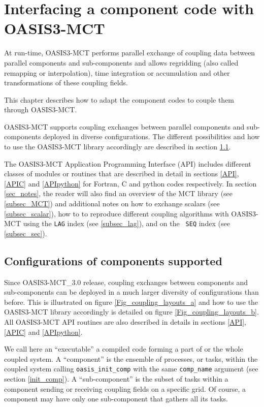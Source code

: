 \newpage
\chapter{Interfacing a component code with OASIS3-MCT}
\label{sec_modelinterfacing}

At run-time, OASIS3-MCT performs parallel exchange of coupling data between parallel
components and sub-components and allows regridding (also called remapping or interpolation), time integration or accumulation and other transformations of these coupling fields.

This chapter describes how to adapt the component codes to couple them through OASIS3-MCT.

OASIS3-MCT supports coupling exchanges between parallel
components and sub-components deployed in diverse
configurations. The different possibilities and how to use
the OASIS3-MCT library accordingly are described in section
\ref{sec_deploy}.

The OASIS3-MCT Application Programming Interface (API) includes different classes of modules or routines that are described in detail in sections \ref{API}, \ref{APIC} and \ref{APIpython} for Fortran, C and python codes respectively.
In section \ref{sec_notes}, the reader will also find an overview of the MCT library (see \ref{subsec_MCT}) and additional notes on how to exchange scalars (see \ref{subsec_scalar}), how to to reproduce different coupling
algorithms with OASIS3-MCT using the {\tt LAG} index (see \ref{subsec_lag}), and on the {\tt
  SEQ} index (see \ref{subsec_sec}).

\section{Configurations of components supported}
\label{sec_deploy}

Since OASIS3-MCT\_3.0 release, coupling exchanges between components and
sub-components can be deployed in a much larger diversity of configurations
than before. This is illustrated on figure
\ref{Fig_coupling_layouts_a} and how to use the OASIS3-MCT library
accordingly is detailed on figure \ref{Fig_coupling_layouts_b}. All
OASIS3-MCT API routines are also described in details in sections
\ref{API}, \ref{APIC} and \ref{APIpython}.

We call here an ``executable'' a compiled code
  forming a part of or the whole coupled system. A ``component'' is the ensemble of
  processes, or tasks, within the coupled system calling {\tt oasis\_init\_comp}
  with the same {\tt comp\_name} argument (see section
  \ref{init_comp}). A ``sub-component'' is the subset of tasks within a
  component sending or receiving coupling fields on a specific grid. Of course, a component may have only one sub-component
  that gathers all its tasks.


